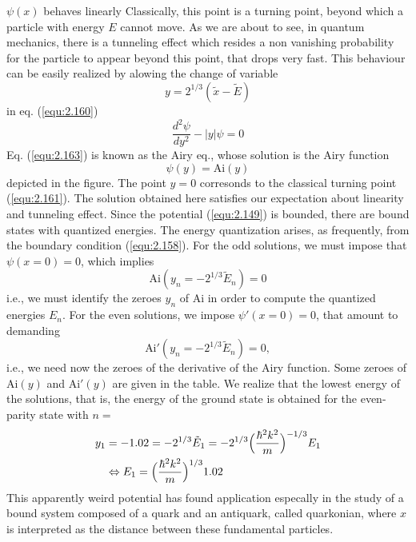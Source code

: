 $\psi(x)$ behaves linearly Classically, this point is a
turning point, beyond which a particle with energy $E$
cannot move. As we are about to see, in quantum mechanics,
there is a tunneling effect which resides a non vanishing
probability for the particle to appear beyond this point,
that drops very fast. This behaviour can be easily realized
by alowing the change of variable
\begin{equation}
  y = 2^{1/3} (\tilde{x}-\tilde{E})
  \label{equ:2.162}
\end{equation}
in eq. (\ref{equ:2.160})
\begin{equation}
  \frac{d^2 \psi}{dy^2} - |y| \psi = 0
  \label{equ:2.163}
\end{equation}
Eq. (\ref{equ:2.163}) is known as the Airy eq., whose
solution is the Airy function
\begin{equation}
  \psi(y) = \text{Ai}(y)
  \label{equ:2.164}
\end{equation}
depicted in the figure. The point $y=0$ corresonds to the
classical turning point (\ref{equ:2.161}). The solution
obtained here satisfies our expectation about linearity and
tunneling effect.
Since the potential (\ref{equ:2.149}) is bounded, there are
bound states with quantized energies. The energy
quantization arises, as frequently, from the boundary
condition (\ref{equ:2.158}).
For the odd solutions, we must impose that $\psi(x=0) = 0$,
which implies
\begin{equation}
  \text{Ai}(y_n = -2^{1/3}\tilde{E}_n) = 0
  \label{equ:2.164}
\end{equation}
i.e., we must identify the zeroes $y_n$ of $\text{Ai}$ in
order to compute the quantized energies $E_n$. For the even
solutions, we impose $\psi'(x=0) = 0$, that amount  to
demanding
\begin{equation}
  \text{Ai}'(y_n = -2^{1/3}\tilde{E}_n) = 0,
  \label{equ:2.165}
\end{equation}
i.e., we need now the zeroes of the derivative of the Airy
function. Some zeroes of $\text{Ai}(y)$ and $\text{Ai}'(y)$
are given in the table.
We realize that the lowest energy of the solutions, that is,
the energy of the ground state is obtained for the
even-parity state with $n =$
\begin{alignat}{2}
  y_1 &= -1.02 = -2^{1/3}\tilde{E}_1 = -2^{1/3}
  \Bigl(\frac{\hbar^2 k^2}{m}\Bigr)^{-1/3}E_1\nonumber\\
  &\Leftrightarrow E_1 = \Bigl(\frac{\hbar^2
k^2}{m}\Bigr)^{1/3} 1.02 \label{equ:2.166}
\end{alignat}
This apparently weird potential has found application
especally in the study of a bound system composed of a quark
and an antiquark, called quarkonian, where $x$ is
interpreted as the distance between these fundamental
particles.
